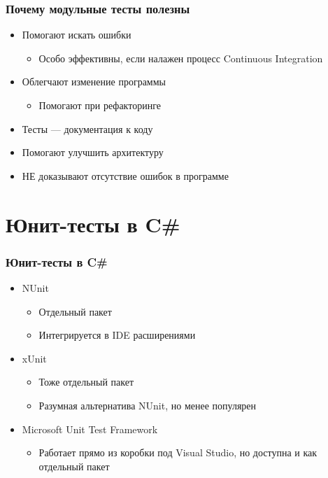 \documentclass{../../slides-style}
\begin{document}
    \begin{frame}
        \frametitle{Почему модульные тесты полезны}
        \begin{itemize}
            \item Помогают искать ошибки
            \begin{itemize}
                \item Особо эффективны, если налажен процесс Continuous Integration
            \end{itemize}
            \item Облегчают изменение программы
            \begin{itemize}
                \item Помогают при рефакторинге
            \end{itemize}
            \item Тесты --- документация к коду
            \item Помогают улучшить архитектуру
            \item НЕ доказывают отсутствие ошибок в программе
        \end{itemize}
    \end{frame}

    \section{Юнит-тесты в C\#}

    \begin{frame}
        \frametitle{Юнит-тесты в C\#}
        \begin{itemize}
            \item NUnit
            \begin{itemize}
                \item Отдельный пакет
                \item Интегрируется в IDE расширениями
            \end{itemize}
            \item xUnit
            \begin{itemize}
                \item Тоже отдельный пакет
                \item Разумная альтернатива NUnit, но менее популярен
            \end{itemize}
            \item Microsoft Unit Test Framework
            \begin{itemize}
                \item Работает прямо из коробки под Visual Studio, но доступна и как отдельный пакет
            \end{itemize}
        \end{itemize}
    \end{frame}
\end{document}
